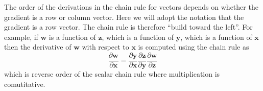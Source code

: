 \documentclass[11pt,a4paper]{report}
\begin{document}
The order of the derivations in the chain rule for vectors depends on whether the gradient is a row or column
vector. Here we will adopt the notation that the gradient is a row vector. The
chain rule is therefore ``build toward the left''. For example, if $\mathbf{w}$
is a function of $\mathbf{z}$, which is a function of $\mathbf{y}$, which is a
function of $\mathbf{x}$ then the derivative of $\mathbf{w}$ with respect to
$\mathbf{x}$ is computed using the chain rule as
\begin{equation*}
\frac{\partial \mathbf{w}}{\partial \mathbf{x}} = \frac{\partial
  \mathbf{y}}{\partial \mathbf{x}}\frac{\partial \mathbf{z}}{\partial
  \mathbf{y}}\frac{\partial \mathbf{w}}{\partial \mathbf{z}} 
\end{equation*}
which is reverse order of the scalar chain rule where multiplication is
comutitative.
\end{document}

